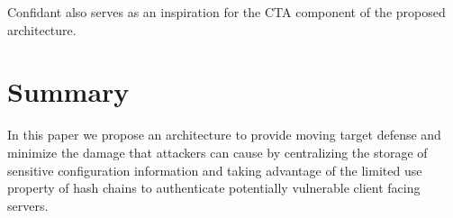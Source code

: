 \documentclass{sig-alternate-05-2015}
\begin{document}
Confidant also serves as an inspiration for the CTA component of the proposed architecture.

\section{Summary}

In this paper we propose an architecture to provide moving target defense and minimize the damage that attackers can cause by centralizing the storage of sensitive configuration information and taking advantage of the limited use property of hash chains to authenticate potentially vulnerable client facing servers. 





%
%
\end{document}
